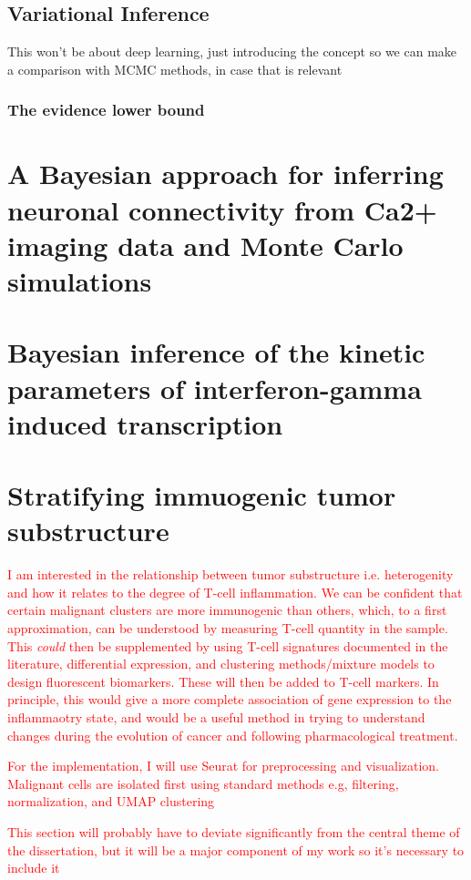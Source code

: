 \documentclass{ucetd}
\begin{document}
\section{Variational Inference}

This won't be about deep learning, just introducing the concept so we can make a comparison with MCMC methods, in case that is relevant

\subsection{The evidence lower bound}


\chapter{A Bayesian approach for inferring neuronal connectivity from Ca2+ imaging data and Monte Carlo simulations}

\chapter{Bayesian inference of the kinetic parameters of interferon-gamma induced transcription}

\chapter{Stratifying immuogenic tumor substructure}

\textcolor{red}{I am interested in the relationship between tumor substructure i.e. heterogenity and how it relates to the degree of T-cell inflammation. We can be confident that certain malignant clusters are more immunogenic than others, which, to a first approximation, can be understood by measuring T-cell quantity in the sample. This \emph{could} then be supplemented by using T-cell signatures documented in the literature, differential expression, and clustering methods/mixture models to design fluorescent biomarkers. These will then be added to T-cell markers. In principle, this would give a more complete association of gene expression to the inflammaotry state, and would be a useful method in trying to understand changes during the evolution of cancer and following pharmacological treatment.}

\vspace{0.2in}

\textcolor{red}{For the implementation, I will use Seurat for preprocessing and visualization. Malignant cells are isolated first using standard methods e.g, filtering, normalization, and UMAP clustering}

\vspace{0.2in}

\textcolor{red}{This section will probably have to deviate significantly from the central theme of the dissertation, but it will be a major component of my work so it's necessary to include it}


\makebibliography
\end{document}
